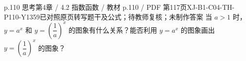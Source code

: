 \par\noindent\begin{minipage}{\linewidth}
\begin{bankitem}{p.110 思考}{第4章 / 4.2 指数函数 / 教材 p.110 / PDF 第117页}{XJ-B1-C04-TH-P110-Y1359}{已对照原页转写题干及公式；待教师复核；未制作答案}
当 $a>1$ 时，$y=a^x$ 和 $y=\left(\dfrac1a\right)^x$ 的图象有什么关系？能否利用 $y=a^x$ 的图象画出 $y=\left(\dfrac1a\right)^x$ 的图象？
\end{bankitem}
\end{minipage}\par\medskip
